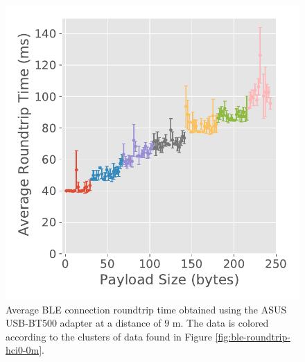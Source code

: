 \begin{figure}[H]
\begin{minipage}{0.45\linewidth}
        \includegraphics[width=\linewidth]{images/ble-roundtrip-hci0-900cm.pdf}
        \caption[Average \acs{BLE} connection roundtrip time obtained using the ASUS USB-BT500 adapter at a distance of 9 m.]{Average \acs{BLE} connection roundtrip time obtained using the ASUS USB-BT500 adapter at a distance of $9\text{ m}$. The data is colored according to the clusters of data found in Figure \ref{fig:ble-roundtrip-hci0-0m}.}
        \label{fig:ble-roundtrip-hci0-9m}
    \end{minipage}
\end{figure}

